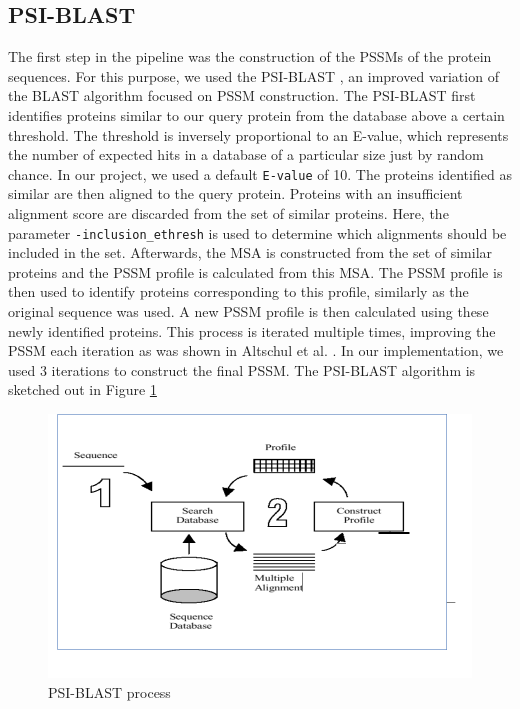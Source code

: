 \subsection{PSI-BLAST}
The first step in the pipeline was the construction of the PSSMs of the protein sequences.
For this purpose, we used the PSI-BLAST \cite{altschul1997gapped}, an improved variation of the BLAST algorithm focused on PSSM construction.
The PSI-BLAST first identifies proteins similar to our query protein from the database above a certain threshold.
The threshold is inversely proportional to an E-value, which represents the number of expected hits in a database of a particular size just by random chance.
In our project, we used a default \texttt{E-value} of 10.
The proteins identified as similar are then aligned to the query protein.
Proteins with an insufficient alignment score are discarded from the set of similar proteins.
Here, the parameter \texttt{-inclusion\_ethresh} is used to determine which alignments should be included in the set. 
Afterwards, the MSA is constructed from the set of similar proteins and the PSSM profile is calculated from this MSA.
The PSSM profile is then used to identify proteins corresponding to this profile, similarly as the original sequence was used.
A new PSSM profile is then calculated using these newly identified proteins.
This process is iterated multiple times, improving the PSSM each iteration as was shown in Altschul et al. \cite{altschul1997gapped}.
In our implementation, we used 3 iterations to construct the final PSSM. 
The PSI-BLAST algorithm is sketched out in Figure \ref{fig:psi_blast}
\begin{figure}
    \centering
    \includegraphics[width=\linewidth]{imgs_andy/psi_blast.png}
    \caption{PSI-BLAST process}
    \label{fig:psi_blast}
\end{figure}

